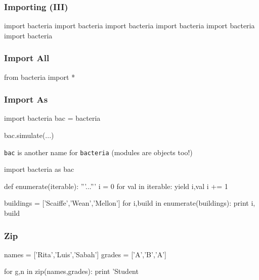 \begin{frame}[fragile]
\frametitle{Importing (III)}

\begin{python}
import bacteria
import bacteria
import bacteria
import bacteria
import bacteria
import bacteria
\end{python}
\end{frame}

\begin{frame}[fragile]
\frametitle{Import All}

\begin{python}
from bacteria import *
\end{python}

\end{frame}

\begin{frame}[fragile]
\frametitle{Import As}

\begin{python}
import bacteria
bac = bacteria

bac.simulate(...)
\end{python}

\lstinline{bac} is another name for \lstinline{bacteria} (modules are objects too!)

\pause

\begin{python}
import bacteria as bac
\end{python}
\end{frame}

\begin{frame}[fragile]
\begin{python}
def enumerate(iterable):
    '''...'''
    i = 0
    for val in iterable:
        yield i,val
        i += 1
\end{python}

\begin{python}
buildings = ['Scaiffe','Wean','Mellon']
for i,build in enumerate(buildings):
    print i, build
\end{python}
\end{frame}

\begin{frame}[fragile]
\frametitle{Zip}

\begin{python}
names = ['Rita','Luis','Sabah']
grades = ['A','B','A']

for g,n in zip(names,grades):
    print 'Student %
\end{python}

\end{frame}

